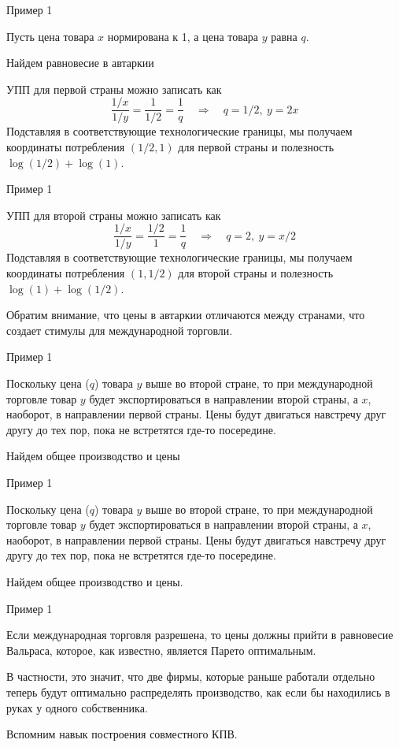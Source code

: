 \documentclass{beamer}
\begin{document}
\begin{frame}{Пример 1}

Пусть цена товара $x$ нормирована к 1, а цена товара $y$ равна $q$.

Найдем равновесие в автаркии

УПП для первой страны можно записать как
$$ \frac{1/x}{1/y} = \frac{1}{1/2} = \frac{1}{q} \quad \Rightarrow \quad q = 1/2, \ y = 2x$$
Подставляя в соответствующие технологические границы, мы получаем координаты потребления $(1/2,1)$ для первой страны и полезность $\log(1/2) + \log(1)$.

\end{frame}

\begin{frame}{Пример 1}

УПП для второй страны можно записать как
$$ \frac{1/x}{1/y} = \frac{1/2}{1} = \frac{1}{q} \quad \Rightarrow \quad q = 2, \ y = x/2$$
Подставляя в соответствующие технологические границы, мы получаем координаты потребления $(1,1/2)$ для второй страны и полезность $\log(1) + \log(1/2)$.

Обратим внимание, что \alert{цены в автаркии отличаются} между странами, что создает стимулы для международной торговли.

\end{frame}

\begin{frame}{Пример 1}

Поскольку цена ($q$) товара $y$ выше во второй стране, то при международной торговле товар $y$ будет экспортироваться в направлении второй страны, а $x$, наоборот, в направлении первой страны. Цены будут двигаться навстречу друг другу до тех пор, пока не встретятся где-то посередине.

Найдем общее производство и цены

\end{frame}

\begin{frame}{Пример 1}

Поскольку цена ($q$) товара $y$ выше во второй стране, то при международной торговле товар $y$ будет экспортироваться в направлении второй страны, а $x$, наоборот, в направлении первой страны. Цены будут двигаться навстречу друг другу до тех пор, пока не встретятся где-то посередине.

Найдем общее производство и цены.

\end{frame}

\begin{frame}{Пример 1}

Если международная торговля разрешена, то цены должны прийти в равновесие Вальраса, которое, как известно, является Парето оптимальным. 

В частности, это значит, что две фирмы, которые раньше работали отдельно теперь будут оптимально распределять производство, как если бы находились в руках у одного собственника.

Вспомним навык построения \alert{совместного КПВ}.
\end{frame}
\end{document}
